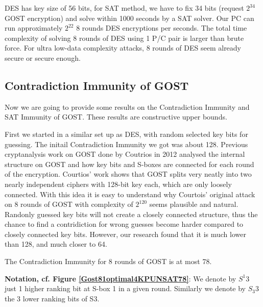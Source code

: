 DES has key size of 56 bits, for SAT method, we have to fix 34 bits (request $2^{34}$ GOST encryption) and solve within 1000 seconds by a SAT solver. Our PC can run approximately $2^{22}$ 8 rounds DES encryptions per seconds. The total time complexity of solving 8 rounds of DES using 1 P/C pair is larger than brute force. For ultra low-data complexity attacks, 8 rounds of DES seem already secure or secure enough.

\subsection{Contradiction Immunity of GOST}

Now we are going to provide some results on the Contradiction Immunity and SAT Immunity of GOST. These results are constructive upper bounds.

First we started in a similar set up as DES, with random selected key bits for guessing. The initail Contradiction Immunity we got was about 128. Previous cryptanalysis work on GOST done by Coutrios in 2012 \cite{gostdc2} analysed the internal structure on GOST and how key bits and S-boxes are connected for each round of the encryption. Courtios' work \cite{gostdc2} shows that GOST splits very neatly into two nearly independent ciphers with 128-bit key each, which are only loosely connected. With this idea it is easy to understand why Courtois' original attack on 8 rounds of GOST with complexity of $2^{120}$ \cite{gostreport} seems plausible and natural. Randonly guessed key bits will not create a closely connected structure, thus the chance to find a contridiction for wrong guesses become harder compared to closely connected key bits.
However, our research found that it is much lower than 128,
and much closer to 64. 
\begin{lemma}
	The Contradiction Immunity for 8 rounds of GOST is at most 78.
\end{lemma}


{\bf Notation, cf. Figure \ref{Gost81optimal4KPUNSAT78}}:
We denote by $S^{1}3$ just 1 higher ranking bit at S-box 1 in a given round.
Similarly we denote by $S_{3}3$ the 3 lower ranking bits of S3.

